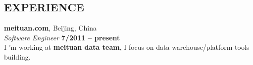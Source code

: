 \documentclass[margin,line]{resume}
\begin{document}
\begin{resume}
\sectionline

    \section{\mysidestyle \textbf{\large{E}\small{XPERIENCE}}}
    \textbf{\listing meituan.com}, Beijing, China \vspace{2mm}\\\vspace{1mm}%
    \textsl{Software Engineer} \hfill \textbf{ 7/2011 -- present}\\
    I 'm working at \textbf{meituan data team}, I focus on data warehouse/platform tools building.\vspace{0.6mm}


\end{resume}
\end{document}
